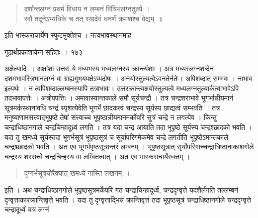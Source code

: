 \documentclass[11pt, openany]{book}
\begin{document}
\begin{quote}
{\qt दर्शान्तलग्नं प्रथमं विधाय न लम्बनं वित्रिभलग्नतुल्ये~।\\
रवौ तदूनेऽभ्यधिके च तत् स्यादेवं धनर्णं क्रमशश्च वेद्यम्~॥}
\end{quote}

इति भास्कराचार्येण स्फुटमुक्तेश्च । नत्यभावस्थानमाह\textendash

\newpage




\hspace{3cm} गूढार्थप्रकाशाकेन सहितः~। \hfill १७३
\vspace{1cm}

\begin{sloppypar}
अक्षेत्यादि~। अक्षांशा उत्तरा ये मध्यभस्य मध्यलग्नस्य क्रान्त्यंशाः । अत्र मध्यस्लग्नशब्देन दशमभावस्त्रिभानलग्नं वा ग्राह्यमुभयपक्षेऽप्यदोषः । अनयोस्तुल्यत्वेऽवनतेर्नतेः। अपिशब्दात् सम्भवः । नाभाव इत्यर्थः । न त्वपिशब्दाल्लम्बनस्यापि तत्राभावः। उत्तरक्रान्त्यक्षयोस्तुल्यत्वे मध्यलग्नतुल्यार्कत्वाभावेऽपि तदभावापत्तेः । अत्रोपपत्तिः । अमावास्यान्तकाले समौ सूर्यचन्द्रौ । तत्र चन्द्रशराभावे भूगर्भान्नीयमानं सूत्रमर्कस्थानावधि चन्द्रं स्पृशत्येवेति भूगर्भे छादकत्वं चन्द्रस्य सूर्यस्य छाद्यत्वं सम्भवति । तत्र मनुष्याणामसत्त्वाद्भूपृष्ठे तेषां सत्त्वाच्च भूपृष्ठान्नीयमानमर्कोपरि सुत्रं चन्द्रे न लगत्येव । किन्तु चन्द्राधिष्ठानगाले चन्द्रचिन्हादूध्र्वं लगति । तत्र यदा चन्द्र आयाति तदा भूपृष्ठे सूर्यस्य चन्द्रश्छादको भवति । यदा तु खमध्ये सूर्यस्तदा भूगर्भसूत्रं भूपृष्ठसूत्रं च सूर्यापरिगमेकमेव चन्द्रे लगतीति भूपृष्ठेऽमान्तकाले चन्द्रश्च्छादको भवति । अत एव भूगर्भपृष्ठसूत्रान्तरं लम्बनम् । भूपृष्ठसूत्रात् सृर्योपरिगाच्चन्द्राधिष्ठानाकाशगोले चन्द्रस्य शरसत्त्वे चन्द्रचिन्हस्य वा लम्बितत्वात् । अत एव भास्कराचार्यैरुक्तम् ।
\end{sloppypar}


\begin{quote}
 {\qt दृग्गर्भसूत्रयोरैक्यात् खमध्ये नास्ति लखनम्~।}
 \end{quote}

\begin{sloppypar}
 इति । अथ चन्द्राधिष्ठानगोले भूपृष्ठसूत्रमर्केपरि गतं चन्द्राचिन्हादूर्ध्वं, चन्द्रदृग्वृत्ते यदंशैर्लगति तल्लम्बनं दृग्वृत्ताकारक्रान्तिवृत्ते भवति । यदा तु दृग्वृत्ताद्भिन्नं क्रान्तिवृत्तं तदा भूपृष्ठसूत्रं चन्द्राधिष्ठानगोले चन्द्रदृग्वृत्ते चन्द्रादूर्ध्वं यत्र लग्नं
\end{sloppypar}
\end{document}
